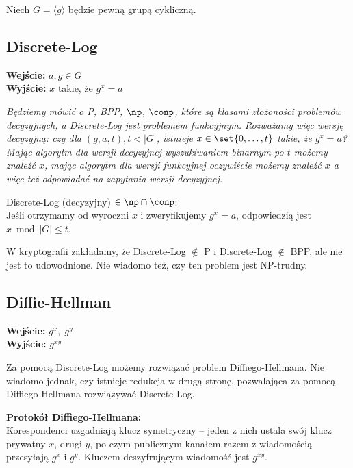 Niech \( G = \langle g \rangle \) będzie pewną grupą cykliczną.

\subsection{Discrete-Log}
\textbf{Wejście:} \( a, g \in G \) \\
\textbf{Wyjście:} \( x \) takie, że \( g^x = a \)

\textit{Będziemy mówić o P, BPP, \(\np\), \(\conp\), które są klasami złożoności problemów decyzyjnych, a Discrete-Log jest problemem funkcyjnym. Rozważamy więc wersję decyzyjną: czy dla \((g, a, t), t < |G|\), istnieje \(x \in \set{0, \ldots, t}\) takie, że \(g^x = a\)? Mając algorytm dla wersji decyzyjnej wyszukiwaniem binarnym po \(t\) możemy znaleźć \(x\), mając algorytm dla wersji funkcyjnej oczywiście możemy znaleźć \(x\) a więc też odpowiadać na zapytania wersji decyzyjnej.}

Discrete-Log (decyzyjny) \( \in \np \cap \conp \):\\
Jeśli otrzymamy od wyroczni \( x \) i zweryfikujemy \( g^x = a \), odpowiedzią jest \( x \bmod |G| \leq t \).

W kryptografii zakładamy, że Discrete-Log \( \notin \) P i Discrete-Log \( \notin \) BPP, ale nie jest to udowodnione. Nie wiadomo też, czy ten problem jest NP-trudny.

\subsection{Diffie-Hellman}
\textbf{Wejście:} \( g^x,\; g^y \) \\
\textbf{Wyjście:} \( g^{xy} \)

Za pomocą Discrete-Log możemy rozwiązać problem Diffiego-Hellmana. Nie wiadomo jednak, czy istnieje redukcja w drugą stronę, pozwalająca za pomocą Diffiego-Hellmana rozwiązywać Discrete-Log.

\textbf{Protokół Diffiego-Hellmana:} \\
Korespondenci uzgadniają klucz symetryczny -- jeden z nich ustala swój klucz prywatny \( x \), drugi \( y \), po czym publicznym kanałem razem z wiadomością przesyłają \( g^x \) i \( g^y \). Kluczem deszyfrującym wiadomość jest \( g^{xy} \).

